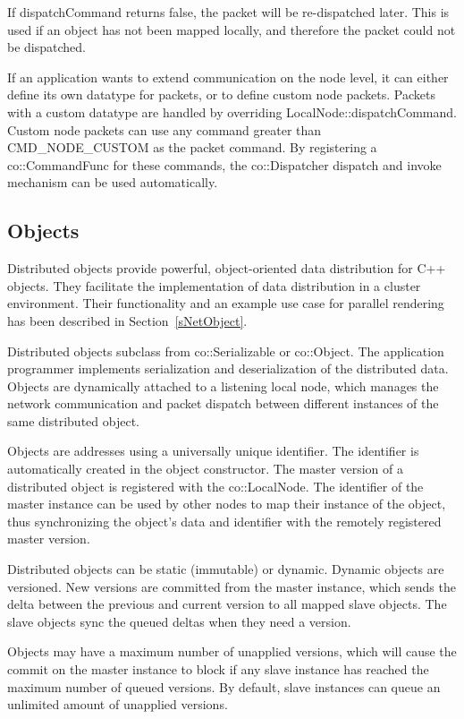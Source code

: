 \documentclass[10pt,a4]{scrartcl}
\newcommand{\sref}[1]{Section~\ref{#1}}
\begin{document}
If \textsf{dispatchCommand} returns false, the packet will be
re-dispatched later. This is used if an object has not been mapped
locally, and therefore the packet could not be dispatched.

If an application wants to extend communication on the node level, it can either
define its own datatype for packets, or to define custom node packets. Packets
with a custom datatype are handled by overriding
\textsf{LocalNode::dispatchCommand}. Custom node packets can use any command
greater than \textsf{CMD\_NODE\_CUSTOM} as the packet command. By registering a
\textsf{co::CommandFunc} for these commands, the \textsf{co::Dispatcher}
dispatch and invoke mechanism can be used automatically.


\subsection{\label{sNetObject2}Objects}

Distributed objects provide powerful, object-oriented data distribution for C++
objects. They facilitate the implementation of data distribution in a cluster
environment. Their functionality and an example use case for parallel rendering
has been described in \sref{sNetObject}.

Distributed objects subclass from \textsf{co::Serializable} or
\textsf{co::Object}. The application programmer implements serialization and
deserialization of the distributed data. Objects are dynamically attached to a
listening local node, which manages the network communication and packet
dispatch between different instances of the same distributed object.

Objects are addresses using a universally unique identifier. The identifier is
automatically created in the object constructor. The master version of a
distributed object is registered with the \textsf{co::LocalNode}. The identifier
of the master instance can be used by other nodes to map their instance of the
object, thus synchronizing the object's data and identifier with the remotely
registered master version.

Distributed objects can be static (immutable) or dynamic. Dynamic objects are
versioned. New versions are committed from the master instance, which sends
the delta between the previous and current version to all mapped slave
objects. The slave objects sync the queued deltas when they need a
version.

Objects may have a maximum number of unapplied versions, which will cause the
commit on the master instance to block if any slave instance has reached the
maximum number of queued versions. By default, slave instances can queue an
unlimited amount of unapplied versions.
\end{document}
